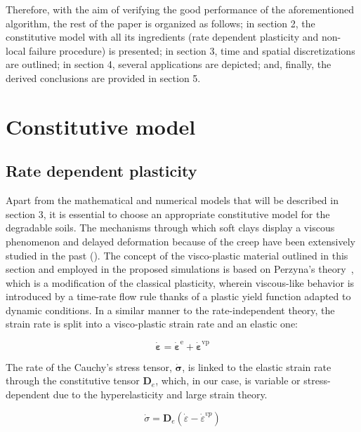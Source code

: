 \documentclass[applsci,journal,article,submit,moreauthors,pdftex]{Definitions/mdpi}
\begin{document}
Therefore, with the aim of verifying the good performance of the aforementioned algorithm, the rest of the paper is organized as follows; in section 2, the constitutive model with all its ingredients (rate dependent plasticity and non-local failure procedure) is presented; in section 3, time and spatial discretizations are outlined; in section 4, several applications are depicted; and, finally, the derived conclusions are provided in section 5.

 
\section{Constitutive model}


\subsection{Rate dependent plasticity}
Apart from the mathematical and numerical models that will be described in section 3, it is essential to choose an appropriate constitutive model for the degradable soils. The mechanisms through which soft clays display a viscous phenomenon and delayed deformation because of the creep have been extensively studied in the past (\cite{Bjerrum1967}).
The concept of the visco-plastic material outlined in this section and employed in the proposed simulations is based on Perzyna’s theory~\cite{Perzyna:66}, which is a modification of the classical plasticity, wherein viscous-like behavior is introduced by a time-rate flow rule thanks of a plastic yield function adapted to dynamic conditions. In a similar manner to the rate-independent theory, the strain rate is split into a visco-plastic strain rate and an elastic one:

\begin{equation}
\dot{\boldsymbol{\varepsilon}}=\dot{\boldsymbol{\varepsilon}}^{\mathrm{e}}+\dot{\boldsymbol{\varepsilon}}^{\mathrm{vp}}
\end{equation}

The rate of the Cauchy's stress tensor, $\boldsymbol{\dot{\sigma}}$, is linked to the elastic strain rate through the constitutive tensor $\boldsymbol{D}_{e}$, which, in our case, is variable or stress-dependent due to the hyperelasticity and large strain theory.

\begin{equation}
\dot{\sigma}=\mathbf{D}_{e}\left(\dot{\varepsilon}-\dot{\varepsilon}^{v p}\right)
\end{equation}
\end{document}
